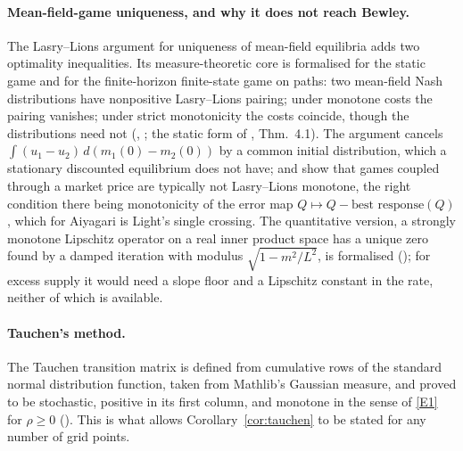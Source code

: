 \paragraph{Mean-field-game uniqueness, and why it does not reach Bewley.}
The Lasry--Lions argument for uniqueness of mean-field equilibria adds two optimality inequalities.
Its measure-theoretic core is formalised for the static game and for the finite-horizon
finite-state game on paths: two mean-field Nash distributions have nonpositive Lasry--Lions pairing;
under monotone costs the pairing vanishes; under strict monotonicity the costs coincide, though the
distributions need not (, ; the
static form of \citealp{CannarsaCapuani2018}, Thm.\ 4.1). The argument cancels
$\int(u_1-u_2)\,d(m_1(0)-m_2(0))$ by a common initial distribution, which a stationary discounted
equilibrium does not have; and \citet{GraberMatter2024} show that games coupled through a market
price are typically not Lasry--Lions monotone, the right condition there being monotonicity of the
error map $Q\mapsto Q-\text{best response}(Q)$, which for Aiyagari is Light's single crossing. The
quantitative version, a strongly monotone Lipschitz operator on a real inner product space has a
unique zero found by a damped iteration with modulus $\sqrt{1-m^2/L^2}$, is formalised
(); for excess supply it would need a slope floor
and a Lipschitz constant in the rate, neither of which is available.

\paragraph{Tauchen's method.}
The Tauchen transition matrix is defined from cumulative rows of the standard normal distribution
function, taken from Mathlib's Gaussian measure, and proved to be stochastic, positive in its first
column, and monotone in the sense of \ref{E1} for $\rho\ge0$
(). This is what allows Corollary~\ref{cor:tauchen} to be
stated for any number of grid points.
